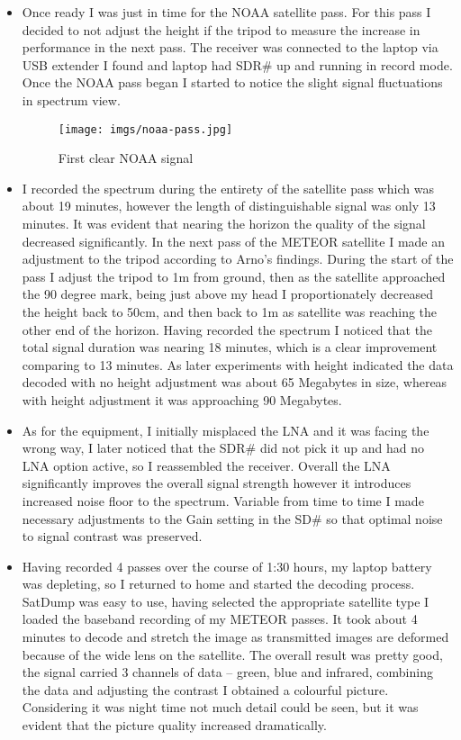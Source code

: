 \documentclass{article}
\begin{document}
        \begin{itemize}
            \item[] Once ready I was just in time for the NOAA satellite pass. For this pass I decided to not adjust the height if the tripod to measure the increase in performance in the next pass. The receiver was connected to the laptop via USB extender I found and laptop had SDR\# up and running in record mode. Once the NOAA pass began I started to notice the slight signal fluctuations in spectrum view.

            \begin{figure}[H]
                    \centering
                    \texttt{[image: imgs/noaa-pass.jpg]}
                    \caption{First clear NOAA signal}
                    \label{img:mount}
                \end{figure}

            \item[] I recorded the spectrum during the entirety of the satellite pass which was about 19 minutes, however the length of distinguishable signal was only 13 minutes. It was evident that nearing the horizon the quality of the signal decreased significantly. In the next pass of the METEOR satellite I made an adjustment to the tripod according to Arno's findings. During the start of the pass I adjust the tripod to 1m from ground, then as the satellite approached the 90 degree mark, being just above my head I proportionately decreased the height back to 50cm, and then back to 1m as satellite was reaching the other end of the horizon. Having recorded the spectrum I noticed that the total signal duration was nearing 18 minutes, which is a clear improvement comparing to 13 minutes. As later experiments with height indicated the data decoded with no height adjustment was about 65 Megabytes in size, whereas with height adjustment it was approaching 90 Megabytes.

            \item[] As for the equipment, I initially misplaced the LNA and it was facing the wrong way, I later noticed that the SDR\# did not pick it up and had no LNA option active, so I reassembled the receiver. Overall the LNA significantly improves the overall signal strength however it introduces increased noise floor to the spectrum. Variable from time to time I made necessary adjustments to the Gain setting in the SD\# so that optimal noise to signal contrast was preserved.

            \item[] Having recorded 4 passes over the course of 1:30 hours, my laptop battery was depleting, so I returned to home and started the decoding process. SatDump was easy to use, having selected the appropriate satellite type I loaded the baseband recording of my METEOR passes. It took about 4 minutes to decode and stretch the image as transmitted images are deformed because of the wide lens on the satellite. The overall result was pretty good, the signal carried 3 channels of data -- green, blue and infrared, combining the data and adjusting the contrast I obtained a colourful picture. Considering it was night time not much detail could be seen, but it was evident that the picture quality increased dramatically.


\end{itemize}
\end{document}
